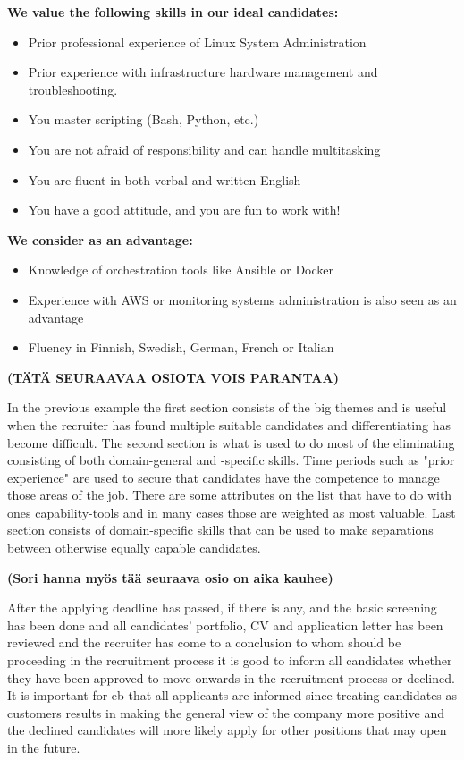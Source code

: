\documentclass[11pt,a4paper,oneside,article]{memoir}
\begin{document}
\textbf{We value the following skills in our ideal candidates:}
\vspace{-17pt} 
\begin{itemize}
\item Prior professional experience of Linux System Administration
\item Prior experience with infrastructure hardware management and troubleshooting.
\item You master scripting (Bash, Python, etc.)
\item You are not afraid of responsibility and can handle multitasking
\item You are fluent in both verbal and written English
\item You have a good attitude, and you are fun to work with!
\end{itemize}
\vspace{-17pt}

\textbf{We consider as an advantage:}
\vspace{-17pt} 
\begin{itemize}
\item Knowledge of orchestration tools like Ansible or Docker
\item Experience with AWS or monitoring systems administration is also seen as an advantage
\item Fluency in Finnish, Swedish, German, French or Italian
\end{itemize}
\vspace{-17pt}

\textbf{(TÄTÄ SEURAAVAA OSIOTA VOIS PARANTAA)}

In the previous example the first section consists of the big themes and is useful when the recruiter has found multiple suitable candidates and differentiating has become difficult. The second section is what is used to do most of the eliminating consisting of both domain-general and -specific skills. Time periods such as "prior experience" are used to secure that candidates have the competence to manage those areas of the job. There are some attributes on the list that have to do with ones capability-tools and in many cases those are weighted as most valuable. Last section consists of domain-specific skills that can be used to make separations between otherwise equally capable candidates.

\textbf{(Sori hanna myös tää seuraava osio on aika kauhee)}

After the applying deadline has passed, if there is any, and the basic screening has been done and all candidates' portfolio, CV and application letter has been reviewed and the recruiter has come to a conclusion to whom should be proceeding in the recruitment process it is good to inform all candidates whether they have been approved to move onwards in the recruitment process or declined. It is important for \gls{eb} that all applicants are informed since treating candidates as customers results in making the general view of the company more positive and the declined candidates will more likely apply for other positions that may open in the future.
\end{document}
